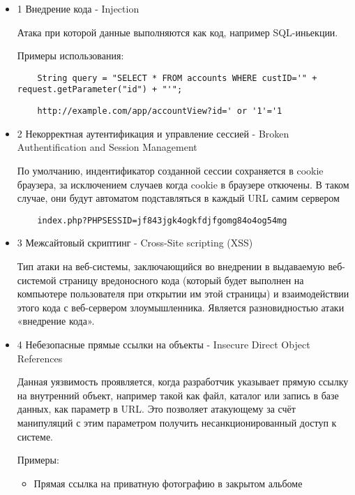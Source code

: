 \documentclass{article}
\begin{document}
\begin{itemize}
	
	\item 1 Внедрение кода - Injection
	
	Атака при которой данные выполняются как код, например SQL-иньекции.
	
	Примеры использования:
	
	\begin{verbatim}
	String query = "SELECT * FROM accounts WHERE custID='" + request.getParameter("id") + "'";
	\end{verbatim}
	
	\begin{verbatim}
	http://example.com/app/accountView?id=' or '1'='1
	\end{verbatim}
	
	\item 2 Некорректная аутентификация и управление сессией - Broken Authentification and Session Management
	
	По умолчанию, индентификатор созданной сессии сохраняется в cookie браузера, за исключением случаев когда cookie в браузере откючены. В таком случае, они будут автоматом подставляться в каждый URL самим сервером
	
	\begin{verbatim}
	index.php?PHPSESSID=jf843jgk4ogkfdjfgomg84o4og54mg
	\end{verbatim}
	
	\item 3 Межсайтовый скриптинг - Cross-Site scripting (XSS)
	
	Тип атаки на веб-системы, заключающийся во внедрении в выдаваемую веб-системой страницу вредоносного кода (который будет выполнен на компьютере пользователя при открытии им этой страницы) и взаимодействии этого кода с веб-сервером злоумышленника. Является разновидностью атаки «внедрение кода».
	
	\item 4 Небезопасные прямые ссылки на объекты - Insecure Direct Object References
	
	Данная уязвимость проявляется, когда разработчик указывает прямую ссылку на внутренний объект, например такой как файл, каталог или запись в базе данных, как параметр в URL. Это позволяет атакующему за счёт манипуляций с этим параметром получить несанкционированный доступ к системе.
	
	Примеры:
	\begin{itemize}
		
		\item Прямая ссылка на приватную фотографию в закрытом альбоме
		

\end{itemize}
\end{itemize}
\end{document}
